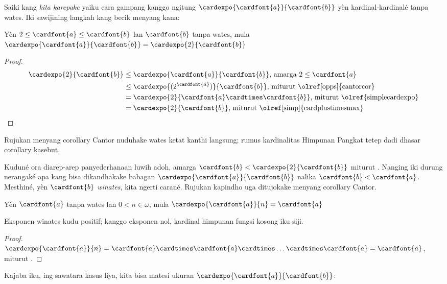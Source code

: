 \documentclass[../../../include/open-logic-section]{subfiles}
\begin{document}
Saiki kang \emph{kita karepake} yaiku cara gampang
kanggo ngitung $\cardexpo{\cardfont{a}}{\cardfont{b}}$
yèn kardinal-kardinalé tanpa wates. Iki sawijining
langkah kang becik menyang kana:

\begin{prop}
Yèn $2 \leq \cardfont{a} \leq \cardfont{b}$ lan $\cardfont{b}$
tanpa wates, mula $\cardexpo{\cardfont{a}}{\cardfont{b}} =
\cardexpo{2}{\cardfont{b}}$
\end{prop}

\begin{proof}
\begin{align*}
	\cardexpo{2}{\cardfont{b}} &\leq
	\cardexpo{\cardfont{a}}{\cardfont{b}}\text{, amarga $2 \leq \cardfont{a}$}\\
	&\leq \cardexpo{(2^\cardfont{a})}{\cardfont{b}}
	\text{, miturut \olref[opps]{cantorcor}}\\
	&= \cardexpo{2}{\cardfont{a} \cardtimes \cardfont{b}}
	\text{, miturut \olref{simplecardexpo}} \\
	&= \cardexpo{2}{\cardfont{b}}
	\text{, miturut \olref[simp]{cardplustimesmax}}
\end{align*}
\end{proof}
Rujukan menyang corollary Cantor nuduhake wates ketat kanthi langsung; rumus kardinalitas Himpunan Pangkat tetep dadi dhasar corollary kasebut.

Kuduné ora diarep-arep panyederhanaan luwih adoh,
amarga $\cardfont{b} < \cardexpo{2}{\cardfont{b}}$ miturut
.
Nanging iki durung nerangaké apa kang bisa dikandhakake
babagan $\cardexpo{\cardfont{a}}{\cardfont{b}}$ nalika $\cardfont{b} <
\cardfont{a}$. Mesthiné, yèn $\cardfont{b}$ \emph{winates},
kita ngerti carané.
Rujukan kapindho uga ditujokake menyang corollary Cantor.

\begin{prop}
Yèn $\cardfont{a}$ tanpa wates lan $0<n \in \omega$, mula
$\cardexpo{\cardfont{a}}{n} = \cardfont{a}$
\end{prop}
Eksponen winates kudu positif; kanggo eksponen nol, kardinal himpunan fungsi kosong iku siji.

\begin{proof}
$\cardexpo{\cardfont{a}}{n} = \cardfont{a} \cardtimes \cardfont{a}
\cardtimes \ldots \cardtimes \cardfont{a} = \cardfont{a}$, miturut .
\end{proof}
\noindent
Kajaba iku, ing sawatara kasus liya, kita bisa matesi ukuran
$\cardexpo{\cardfont{a}}{\cardfont{b}}$:
\end{document}
